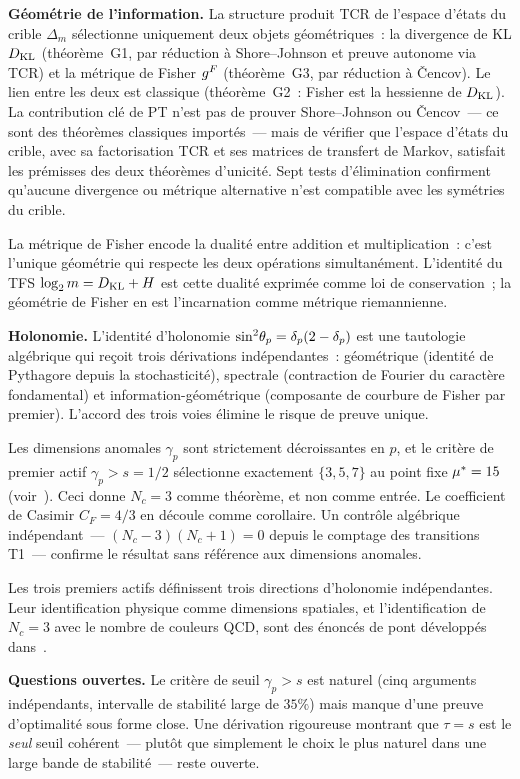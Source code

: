 \documentclass[12pt,a4paper]{article}
\begin{document}
\textbf{Géométrie de l'information.}
La structure produit TCR de l'espace d'états du crible $\Delta_m$
sélectionne uniquement deux objets géométriques~: la divergence de KL
$D_{\mathrm{KL}}$ (théorème~G1, par réduction à Shore--Johnson et preuve autonome
via TCR) et la métrique de Fisher $g^F$ (théorème~G3, par
réduction à \v{C}encov). Le lien entre les deux est classique
(théorème~G2~: Fisher est la hessienne de $D_{\mathrm{KL}}$). La contribution
clé de PT n'est pas de prouver Shore--Johnson ou \v{C}encov~--- ce
sont des théorèmes classiques importés~--- mais de vérifier que
l'espace d'états du crible, avec sa factorisation TCR et ses matrices
de transfert de Markov, satisfait les prémisses des deux théorèmes
d'unicité. Sept tests d'élimination confirment qu'aucune divergence ou
métrique alternative n'est compatible avec les symétries du crible.

La métrique de Fisher encode la dualité entre addition et
multiplication~: c'est l'unique géométrie qui respecte les deux
opérations simultanément. L'identité du TFS $\log_2 m = D_{\mathrm{KL}} + H$ est
cette dualité exprimée comme loi de conservation~; la géométrie de
Fisher en est l'incarnation comme métrique riemannienne.

\textbf{Holonomie.}
L'identité d'holonomie $\sin^2\!\theta_{p} = \delta_p(2 - \delta_p)$ est une
tautologie algébrique qui reçoit trois dérivations indépendantes~:
géométrique (identité de Pythagore depuis la stochasticité), spectrale
(contraction de Fourier du caractère fondamental) et
information-géométrique (composante de courbure de Fisher par
premier). L'accord des trois voies élimine le risque de preuve unique.

Les dimensions anomales $\gamma_p$ sont strictement décroissantes en
$p$, et le critère de premier actif $\gamma_p > s = 1/2$ sélectionne
exactement $\{3, 5, 7\}$ au point fixe ${\mu^{*}} = 15$
(voir~\cite{companion_M3}). Ceci donne $N_c = 3$ comme théorème, et
non comme entrée. Le coefficient de Casimir $C_F = 4/3$ en découle
comme corollaire. Un contrôle algébrique indépendant~---
$(N_c - 3)(N_c + 1) = 0$ depuis le comptage des transitions T1~---
confirme le résultat sans référence aux dimensions anomales.

Les trois premiers actifs définissent trois directions d'holonomie
indépendantes. Leur identification physique comme dimensions
spatiales, et l'identification de $N_c = 3$ avec le nombre de
couleurs QCD, sont des énoncés de pont développés
dans~\cite{companion_M5}.

\textbf{Questions ouvertes.}
Le critère de seuil $\gamma_p > s$ est naturel (cinq arguments
indépendants, intervalle de stabilité large de $35\%$) mais manque
d'une preuve d'optimalité sous forme close. Une dérivation rigoureuse
montrant que $\tau = s$ est le \emph{seul} seuil cohérent~--- plutôt
que simplement le choix le plus naturel dans une large bande de
stabilité~--- reste ouverte.
\end{document}
